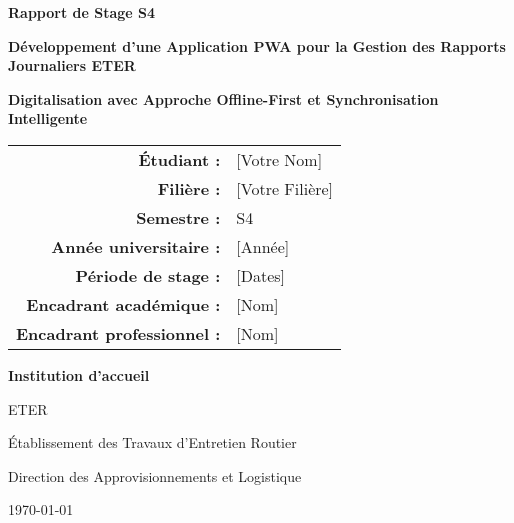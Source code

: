 \documentclass[12pt,a4paper]{report}
\begin{document}
\begin{titlepage}
    \centering
    \vspace*{2cm}
    
    
    \vspace{1cm}
    
    {\huge\bfseries\color{eterblue} Rapport de Stage S4}
    
    \vspace{0.5cm}
    
    {\Large\bfseries Développement d'une Application PWA pour la Gestion des Rapports Journaliers ETER}
    
    \vspace{1.5cm}
    
    {\large\bfseries Digitalisation avec Approche Offline-First et Synchronisation Intelligente}
    
    \vspace{2cm}
    
    \begin{tabular}{rl}
        \textbf{Étudiant :} & [Votre Nom] \\
        \textbf{Filière :} & [Votre Filière] \\
        \textbf{Semestre :} & S4 \\
        \textbf{Année universitaire :} & [Année] \\
        \textbf{Période de stage :} & [Dates] \\
        \textbf{Encadrant académique :} & [Nom] \\
        \textbf{Encadrant professionnel :} & [Nom] \\
    \end{tabular}
    
    \vspace{2cm}
    
    {\large\bfseries Institution d'accueil}
    
    \vspace{0.5cm}
    
    {\Large\color{eterblue} ETER}
    
    {\large Établissement des Travaux d'Entretien Routier}
    
    {\normalsize Direction des Approvisionnements et Logistique}
    
    \vfill
    
    {\large \today}
\end{titlepage}
\end{document}
